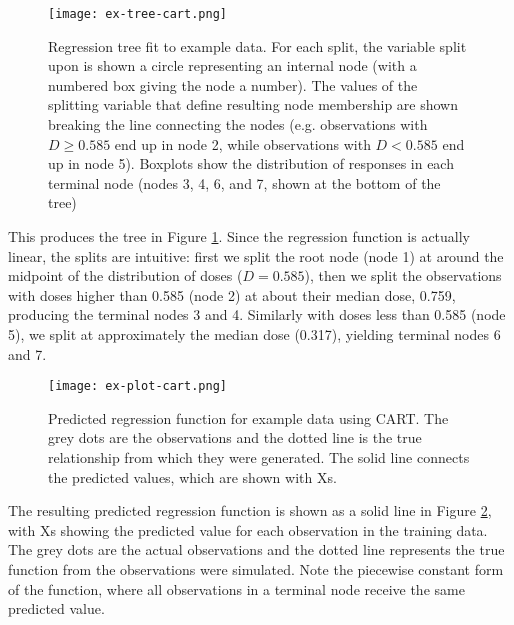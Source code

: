 \documentclass[12pt]{article}
\begin{document}
\begin{figure}[H]
\begin{center}
\texttt{[image: ex-tree-cart.png]}
\end{center}
\caption[Regression tree fit to example data]{Regression tree fit to example data. For each split, the variable split upon is shown a circle representing an internal node (with a numbered box giving the node a number). The values of the splitting variable that define resulting node membership are shown breaking the line connecting the nodes (e.g. observations with $D \geq 0.585$ end up in node 2, while observations with $D < 0.585$ end up in node 5). Boxplots show the distribution of responses in each terminal node (nodes 3, 4, 6, and 7, shown at the bottom of the tree)}
\label{fig:ex-cart-tree}
\end{figure}

This produces the tree in Figure \ref{fig:ex-cart-tree}. Since the regression function is actually linear, the splits are intuitive: first we split the root node (node 1) at around the midpoint of the distribution of doses ($D = 0.585$), then we split the observations with doses higher than 0.585 (node 2) at about their median dose, 0.759, producing the terminal nodes 3 and 4. Similarly with doses less than 0.585 (node 5), we split at approximately the median dose (0.317), yielding terminal nodes 6 and 7. 

\begin{figure}[H]
\begin{center}
\texttt{[image: ex-plot-cart.png]}
\end{center}
\caption[Predicted regression function for example data using CART]{Predicted regression function for example data using CART. The grey dots are the observations and the dotted line is the true relationship from which they were generated. The solid line connects the predicted values, which are shown with Xs.}
\label{fig:ex-plot-cart}
\end{figure}

The resulting predicted regression function is shown as a solid line in Figure \ref{fig:ex-plot-cart}, with Xs showing the predicted value for each observation in the training data. The grey dots are the actual observations and the dotted line represents the true function from the observations were simulated. Note the piecewise constant form of the function, where all observations in a terminal node receive the same predicted value.
\end{document}
